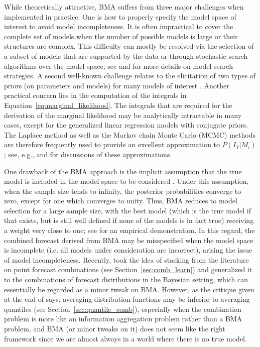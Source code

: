 \documentclass[a4paper,11pt]{article}
\begin{document}
While theoretically attractive, BMA suffers from three major challenges when implemented in practice. One is how to properly specify the model space of interest to avoid model incompleteness. It is often impractical to cover the complete set of models when the number of possible models is large or their structures are complex. This difficulty can mostly be resolved via the selection of a subset of models that are supported by the data or through stochastic search algorithms over the model space; see \citet{Hoeting1999-qn} and \citet{Koop2003-nl} for more details on model search strategies. A second well-known challenge relates to the elicitation of two types of priors (on parameters and models) for many models of interest \citep{Moral-Benito2015-zh,Aastveit2019-lf}. Another practical concern lies in the computation of the integrals in Equation~\eqref{eq:marginal_likelihood}. The integrals that are required for the derivation of the marginal likelihood may be analytically intractable in many cases, except for the generalized linear regression models with conjugate priors. The Laplace method as well as the Markov chain Monte Carlo (MCMC) methods are therefore frequently used to provide an excellent approximation to $P(I_{T}|M_{i})$; see, e.g., \citet{Hoeting1999-qn} and \citet{Bassetti2020-uh} for discussions of these approximations.

One drawback of the BMA approach is the implicit assumption that the true model is included in the model space to be considered \citep{Wright2008-bs}. Under this assumption, when the sample size tends to infinity, the posterior probabilities converge to zero, except for one which converges to unity. Thus, BMA reduces to model selection for a large sample size, with the best model (which is the true model if that exists, but is still well defined if none of the models is in fact true) receiving a weight very close to one; see \citet{Geweke2010-zn} for an empirical demonstration. In this regard, the combined forecast derived from BMA may be misspecified when the model space is incomplete (i.e. all models under consideration are incorrect), arising the issue of model incompleteness. Recently, \citet{Yao2018-st} took the idea of stacking from the literature on point forecast combinations (see Section~\ref{sec:comb_learn}) and generalized it to the combinations of forecast distributions in the Bayesian setting, which can essentially be regarded as a minor tweak on BMA. However, as the critique given at the end of \citet{Yao2018-st} says, averaging distribution functions may be inferior to averaging quantiles (see Section~\ref{sec:quantile_comb}), especially when the combination problem is more like an information aggregation problem rather than a BMA problem, and BMA (or minor tweaks on it) does not seem like the right framework since we are almost always in a world where there is no true model.
\end{document}
